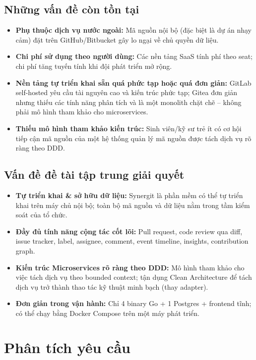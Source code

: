 \subsection{Những vấn đề còn tồn tại}
\begin{itemize}
\item \textbf{Phụ thuộc dịch vụ nước ngoài:} Mã nguồn nội bộ (đặc biệt là dự án nhạy cảm) đặt trên GitHub/Bitbucket gây lo ngại về chủ quyền dữ liệu.
\item \textbf{Chi phí sử dụng theo người dùng:} Các nền tảng SaaS tính phí theo seat; chi phí tăng tuyến tính khi đội phát triển mở rộng.
\item \textbf{Nền tảng tự triển khai sẵn quá phức tạp hoặc quá đơn giản:} GitLab self-hosted yêu cầu tài nguyên cao và kiến trúc phức tạp; Gitea đơn giản nhưng thiếu các tính năng phân tích và là một monolith chặt chẽ -- không phải mô hình tham khảo cho microservices.
\item \textbf{Thiếu mô hình tham khảo kiến trúc:} Sinh viên/kỹ sư trẻ ít có cơ hội tiếp cận mã nguồn của một hệ thống quản lý mã nguồn được tách dịch vụ rõ ràng theo DDD.
\end{itemize}

\subsection{Vấn đề đề tài tập trung giải quyết}
\begin{itemize}
\item \textbf{Tự triển khai \& sở hữu dữ liệu:} Synergit là phần mềm có thể tự triển khai trên máy chủ nội bộ; toàn bộ mã nguồn và dữ liệu nằm trong tầm kiểm soát của tổ chức.
\item \textbf{Đầy đủ tính năng cộng tác cốt lõi:} Pull request, code review qua diff, issue tracker, label, assignee, comment, event timeline, insights, contribution graph.
\item \textbf{Kiến trúc Microservices rõ ràng theo DDD:} Mô hình tham khảo cho việc tách dịch vụ theo bounded context; tận dụng Clean Architecture để tách dịch vụ trở thành thao tác kỹ thuật minh bạch (thay adapter).
\item \textbf{Đơn giản trong vận hành:} Chỉ 4 binary Go + 1 Postgres + frontend tĩnh; có thể chạy bằng Docker Compose trên một máy phát triển.
\end{itemize}

\section{Phân tích yêu cầu}

